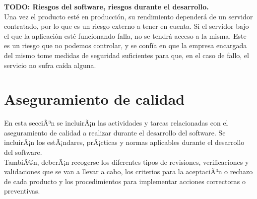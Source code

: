 \textbf{TODO: Riesgos del software, riesgos durante el desarrollo.}
\\

Una vez el producto esté en producción, su rendimiento dependerá de un servidor contratado, por lo que es un riesgo externo a tener en cuenta. Si el servidor bajo el que la aplicación esté funcionando falla, no se tendrá acceso a la misma. Este es un riesgo que no podemos controlar, y se confía en que la empresa encargada del mismo tome medidas de seguridad suficientes para que, en el caso de fallo, el servicio no sufra caída alguna. 


\section{Aseguramiento de calidad}
En esta secciÃ³n se incluirÃ¡n las actividades y tareas relacionadas con el aseguramiento de calidad a realizar durante el desarrollo del software. Se incluirÃ¡n los estÃ¡ndares, prÃ¡cticas y normas aplicables durante el desarrollo del software.\\

TambiÃ©n, deberÃ¡n recogerse los diferentes tipos de revisiones, verificaciones y validaciones que se van a llevar a cabo, los criterios para la aceptaciÃ³n o rechazo de cada producto y los procedimientos para implementar acciones correctoras o preventivas.
